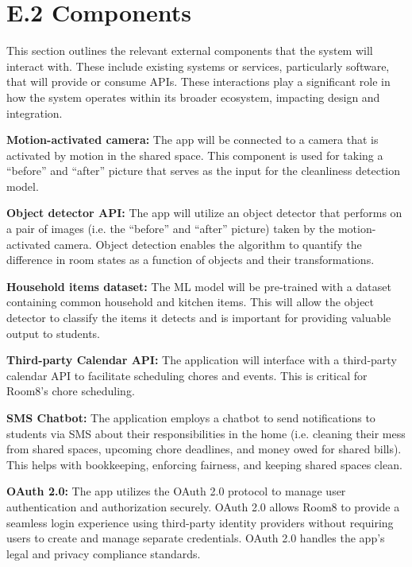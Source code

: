 \documentclass{scrreprt}
\newcommand*{\nsection}[1]{
    \section*{#1}
    \addcontentsline{toc}{section}{#1}
}
\theoremstyle{definition}
\begin{document}
\nsection{E.2 Components}
This section outlines the relevant external components that the system will interact with. These include existing systems or services, particularly software, that will provide or consume APIs. These interactions play a significant role in how the system operates within its broader ecosystem, impacting design and integration.
\begin{flushleft}
  \item \textbf{Motion-activated camera:} The app will be connected to a camera that is activated by motion in the shared space. This component is used for taking a “before” and “after” picture that serves as the input for the cleanliness detection model. \newline
  
  \item \textbf{Object detector API:} The app will utilize an object detector that performs on a pair of images (i.e. the “before” and “after” picture) taken by the motion-activated camera. Object detection enables the algorithm to quantify the difference in room states as a function of objects and their transformations.\newline 
  
  \item \textbf{Household items dataset:} The ML model will be pre-trained with a dataset containing common household and kitchen items. This will allow the object detector to classify the items it detects and is important for providing valuable output to students.\newline
   
  \item \textbf{Third-party Calendar API:} The application will interface with a third-party calendar API to facilitate scheduling chores and events. This is critical for Room8's chore scheduling.\newline

  \item \textbf{SMS Chatbot:} The application employs a chatbot to send notifications to students via SMS about their responsibilities in the home (i.e. cleaning their mess from shared spaces, upcoming chore deadlines, and money owed for shared bills). This helps with bookkeeping, enforcing fairness, and keeping shared spaces clean.\newline

  \item \textbf{OAuth 2.0:} The app utilizes the OAuth 2.0 protocol to manage user authentication and authorization securely. OAuth 2.0 allows Room8 to provide a seamless login experience using third-party identity providers without requiring users to create and manage separate credentials. OAuth 2.0 handles the app’s legal and privacy compliance standards.\newline
  

\end{flushleft}
\end{document}
